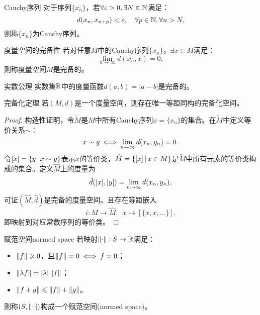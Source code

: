 \begin{definition}
    {Cauchy序列}{}
    对于序列$\{x_n\}$，若$\forall\varepsilon>0,\exists N\in\mathbb N$满足：
    \begin{equation}
        d(x_n,x_{n+p})<\varepsilon,\quad\forall p\in\mathbb N,\forall n>N,
    \end{equation}
    则称$\{x_n\}$为Cauchy序列。
\end{definition}

\begin{definition}
    {度量空间的完备性}{}
    若对任意$M$中的Cauchy序列$\{x_n\}$，$\exists x\in M$满足：
    \[
        \lim_{n\to\infty}d(x_n,x)=0,
    \]
    则称度量空间$M$是完备的。
\end{definition}

\begin{example}
    {实数公理}{}
    实数集$\mathbb R$中的度量函数$d(a,b)=|a-b|$是完备的。
\end{example}

\begin{theorem}
    {完备化定理}{}
    若$(M,d)$是一个度量空间，则存在唯一等距同构的完备化空间。%
\end{theorem}

\begin{proof}
    构造性证明，令$\tilde M$是$M$中所有Cauchy序列$x=\{x_n\}$的集合。在$\tilde M$中定义等价关系$\sim$：
    \[
        x\sim y\iff\lim_{n{\to\infty}}d(x_n,y_n)=0.
    \]
    令$[x]=\{y\,|\,x\sim y\}$表示$x$的等价类，$\hat M=\{[x]\,|\,x\in\tilde M\}$是$\tilde M$中所有元素的等价类构成的集合。定义$\hat M$上的度量为
    \[
        \hat d([x],[y])=\lim_{n{\to\infty}}d(x_n,y_n),
    \]
    可证$(\hat M,\hat d)$是完备的度量空间。且存在等距嵌入
    \[
        i:M\to\hat M,\enspace x\mapsto[\{x,x,\ldots\}].
    \]
    即映射到对应常数序列的等价类。
\end{proof}

\begin{definition}
    {赋范空间}{normed space}
    若映射$\left\lVert\cdot\right\rVert:S\to\mathbb R$满足：
    \begin{itemize}
        \item $\left\lVert f\right\rVert\geqslant 0$，且$\left\lVert f\right\rVert=0\iff f=0$；
        \item $\left\lVert\lambda f\right\rVert=\left\lvert\lambda\right\rvert\left\lVert f\right\rVert$；
        \item $\left\lVert f+g\right\rVert\leqslant\left\lVert f\right\rVert+\left\lVert g\right\rVert$。
    \end{itemize}
    则称$(S,\left\lVert\cdot\right\rVert)$构成一个赋范空间(normed space)。
\end{definition}

